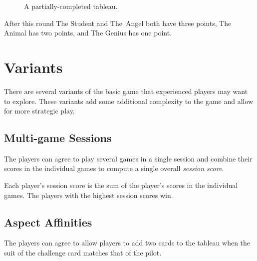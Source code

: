 \documentclass[a4paper, 10pt,notumble]{leaflet}
\DeclareRobustCommand\five[1][black]{\textcolor{#1}{\cardfont{5}}}
\DeclareRobustCommand\six[1][black]{\textcolor{#1}{\cardfont{6}}}
\DeclareRobustCommand\seven[1][black]{\textcolor{#1}{\cardfont{7}}}
\DeclareRobustCommand\eight[1][black]{\textcolor{#1}{\cardfont{8}}}
\DeclareRobustCommand\ace[1][black]{\textcolor{#1}{\cardfont{A}}}
\DeclareRobustCommand\redace[1][red]{\textcolor{#1}{\cardfont{A}}}
\begin{document}
\begin{enumerate}
\begin{figure}[h]\centering
{}
\caption*{A partially-completed tableau.}
\end{figure}

\bigskip
After this round The Student and The~Angel both have three points, The Animal has two points, and The Genius has one point.

\end{enumerate}

\newpage

\section{Variants}
There are several variants of the basic game that experienced players may want to explore. These variants add some additional complexity to the game and allow for more strategic play.

\subsection{Multi-game Sessions}
The players can agree to play several games in a single session and combine their scores in the individual games to compute a single overall \emph{session score}.

Each player's session score is the sum of the player's scores in the individual games. The players with the highest session scores win.
	
\subsection{Aspect Affinities} 
The players can agree to allow players to add two cards to the tableau when the suit of the challenge card matches that of the pilot.
\end{document}
